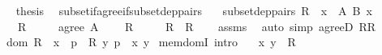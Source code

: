 \begin{isabellebody}
\ \isamarkupfalse%
\ {\isacharquery}{\kern0pt}thesis\ \isacommand{{\isachardot}{\kern0pt}}\isamarkupfalse%
\isanewline
{}\isamarkupfalse%
%
\endisatagproof
{\isafoldproof}%
%
\isadelimproof
\isanewline
%
\endisadelimproof
\isanewline
{}\isamarkupfalse%
\ subset{\isacharunderscore}{\kern0pt}if{\isacharunderscore}{\kern0pt}agree{\isacharunderscore}{\kern0pt}if{\isacharunderscore}{\kern0pt}subset{\isacharunderscore}{\kern0pt}dep{\isacharunderscore}{\kern0pt}pairs{\isacharcolon}{\kern0pt}\isanewline
\ \ \ subset{\isacharunderscore}{\kern0pt}dep{\isacharunderscore}{\kern0pt}pairs{\isacharcolon}{\kern0pt}\ {\isachardoublequoteopen}R\ {\isasymsubseteq}\ {\isasymSum}x\ {\isasymin}\ A{\isachardot}{\kern0pt}\ B\ x{\isachardoublequoteclose}\isanewline
\ \ \ {\isachardoublequoteopen}R\ {\isasymin}\ {\isasymR}{\isachardoublequoteclose}\isanewline
\ \ \ {\isachardoublequoteopen}agree\ A\ {\isasymR}{\isachardoublequoteclose}\isanewline
\ \ \ {\isachardoublequoteopen}R{\isacharprime}{\kern0pt}\ {\isasymin}\ {\isasymR}{\isachardoublequoteclose}\isanewline
\ \ \ {\isachardoublequoteopen}R\ {\isasymsubseteq}\ R{\isacharprime}{\kern0pt}{\isachardoublequoteclose}\isanewline
%
\isadelimproof
\ \ %
\endisadelimproof
%
\isatagproof
{}\isamarkupfalse%
\ assms\ \isamarkupfalse%
\ {\isacharparenleft}{\kern0pt}auto\ simp{\isacharcolon}{\kern0pt}\ agreeD{\isacharbrackleft}{\kern0pt}\ {\isacharquery}{\kern0pt}R{\isacharequal}{\kern0pt}{\isachardoublequoteopen}R{\isachardoublequoteclose}{\isacharbrackright}{\kern0pt}{\isacharparenright}{\kern0pt}%
\endisatagproof
{\isafoldproof}%
%
\isadelimproof
%
\endisadelimproof
%
\isadelimdocument
%
\endisadelimdocument
%
\isatagdocument
%
\isamarkuptrue%
%
\endisatagdocument
{\isafolddocument}%
%
\isadelimdocument
%
\endisadelimdocument
{}\isamarkupfalse%
\ {\isachardoublequoteopen}dom\ R\ {\isasymequiv}\ {\isacharbraceleft}{\kern0pt}x\ {\isacharbar}{\kern0pt}\ p\ {\isasymin}\ R{\isacharcomma}{\kern0pt}\ {\isasymexists}y{\isachardot}{\kern0pt}\ p\ {\isacharequal}{\kern0pt}\ {\isasymlangle}x{\isacharcomma}{\kern0pt}\ y{\isasymrangle}{\isacharbraceright}{\kern0pt}{\isachardoublequoteclose}\isanewline
\isanewline
{}\isamarkupfalse%
\ mem{\isacharunderscore}{\kern0pt}domI\ {\isacharbrackleft}{\kern0pt}intro{\isacharbrackright}{\kern0pt}{\isacharcolon}{\kern0pt}\isanewline
\ \ \ {\isachardoublequoteopen}{\isasymlangle}x{\isacharcomma}{\kern0pt}\ y{\isasymrangle}\ {\isasymin}\ R{\isachardoublequoteclose}\isanewline

\end{isabellebody}
